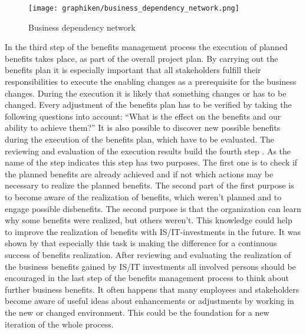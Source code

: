 \begin{figure}[h]
\centering
\texttt{[image: graphiken/business\_dependency\_network.png]}%
\caption{Business dependency network \citep[p.445]{ward2002}}%
\label{business_dependency_network}%
\end{figure}

In the third step of the benefits management process \citep[cf.][p.75f.]{ward_benefits_2012} the execution of planned benefits takes place, as part of the overall project plan. By carrying out the benefits plan it is especially important that all stakeholders fulfill their responsibilities to execute the enabling changes as a prerequisite for the business changes. During the execution it is likely that something changes or has to be changed. Every adjustment of the benefits plan has to be verified by taking the following questions into account: ``What is the effect on the benefits and our ability to achieve them?'' \citep[p.76]{ward_benefits_2012} It is also possible to discover new possible benefits during the execution of the benefits plan, which have to be evaluated.
\newline\newline
The reviewing and evaluation of the execution results build the fourth step \citep[cf.][p.78f.]{ward_benefits_2012}. As the name of the step indicates this step has two purposes. The first one is to check if the planned benefits are already achieved and if not which actions may be necessary to realize the planned benefits. The second part of the first purpose is to become aware of the realization of benefits, which weren't planned and to engage possible disbenefits. The second purpose is that the organization can learn why some benefits were realized, but others weren't. This knowledge could help to improve the realization of benefits with IS/IT-investments in the future. It was shown by \citet[cited in][p.78]{ward_benefits_2012} that especially this task is making the difference for a continuous success of benefits realization.
\newline\newline
After reviewing and evaluating the realization of the business benefits gained by IS/IT investments all involved persons should be encouraged in the last step of the benefits management process \citep[cf.][p.79f.]{ward_benefits_2012} to think about further business benefits. It often happens that many employees and stakeholders become aware of useful ideas about enhancements or adjustments by working in the new or changed environment. This could be the foundation for a new iteration of the whole process.


